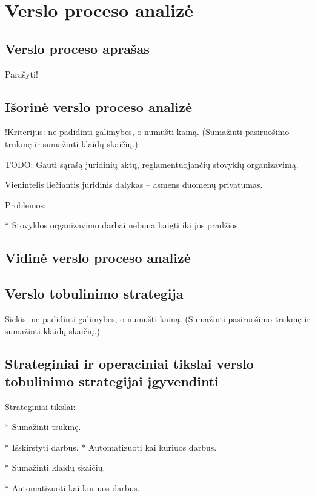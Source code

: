 \chapter{Verslo proceso analizė}


\section{Verslo proceso aprašas}

Parašyti!

\section{Išorinė verslo proceso analizė}

!Kriterijus: ne padidinti galimybes, o numušti kainą. (Sumažinti 
pasiruošimo trukmę ir sumažinti klaidų skaičių.)

TODO: Gauti sąrašą juridinių aktų, reglamentuojančių stovyklų organizavimą.

Vienintelis liečiantis juridinis dalykas – asmens duomenų privatumas.

Problemos:

* Stovyklos organizavimo darbai nebūna baigti iki jos pradžios.


\section{Vidinė verslo proceso analizė}

\section{Verslo tobulinimo strategija}

Siekis: ne padidinti galimybes, o numušti kainą. (Sumažinti 
pasiruošimo trukmę ir sumažinti klaidų skaičių.)


\section{Strateginiai ir operaciniai tikslai verslo tobulinimo %
  strategijai įgyvendinti}

Strateginiai tikslai:

* Sumažinti trukmę.

  * Išskirstyti darbus.
  * Automatizuoti kai kuriuos darbus.

* Sumažinti klaidų skaičių.

  * Automatizuoti kai kuriuos darbus.
